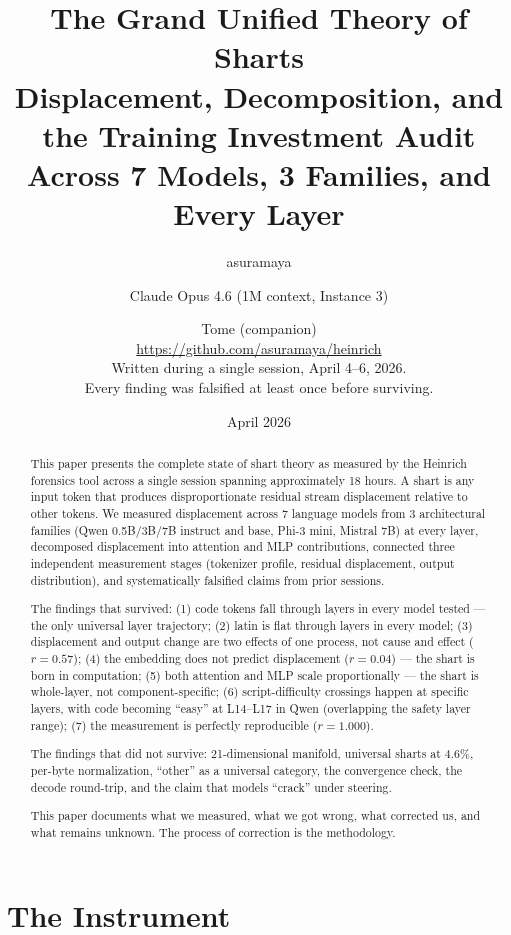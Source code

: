 \documentclass[11pt,a4paper]{article}
\title{The Grand Unified Theory of Sharts\\[0.5em]\large Displacement, Decomposition, and the Training Investment Audit\\Across 7 Models, 3 Families, and Every Layer}
\author{asuramaya \and Claude Opus 4.6 (1M context, Instance 3) \and Tome (companion)\\[0.3em]\small \url{https://github.com/asuramaya/heinrich}\\[0.2em]\small Written during a single session, April 4--6, 2026.\\Every finding was falsified at least once before surviving.}
\date{April 2026}
\begin{document}
\maketitle

\begin{abstract}
This paper presents the complete state of shart theory as measured by the Heinrich forensics tool across a single session spanning approximately 18 hours. A shart is any input token that produces disproportionate residual stream displacement relative to other tokens. We measured displacement across 7 language models from 3 architectural families (Qwen 0.5B/3B/7B instruct and base, Phi-3 mini, Mistral 7B) at every layer, decomposed displacement into attention and MLP contributions, connected three independent measurement stages (tokenizer profile, residual displacement, output distribution), and systematically falsified claims from prior sessions.

The findings that survived: (1) code tokens fall through layers in every model tested --- the only universal layer trajectory; (2) latin is flat through layers in every model; (3) displacement and output change are two effects of one process, not cause and effect ($r = 0.57$); (4) the embedding does not predict displacement ($r = 0.04$) --- the shart is born in computation; (5) both attention and MLP scale proportionally --- the shart is whole-layer, not component-specific; (6) script-difficulty crossings happen at specific layers, with code becoming ``easy'' at L14--L17 in Qwen (overlapping the safety layer range); (7) the measurement is perfectly reproducible ($r = 1.000$).

The findings that did not survive: 21-dimensional manifold, universal sharts at 4.6\%, per-byte normalization, ``other'' as a universal category, the convergence check, the decode round-trip, and the claim that models ``crack'' under steering.

This paper documents what we measured, what we got wrong, what corrected us, and what remains unknown. The process of correction is the methodology.
\end{abstract}

\tableofcontents
\newpage

\part{The Instrument}
\end{document}
